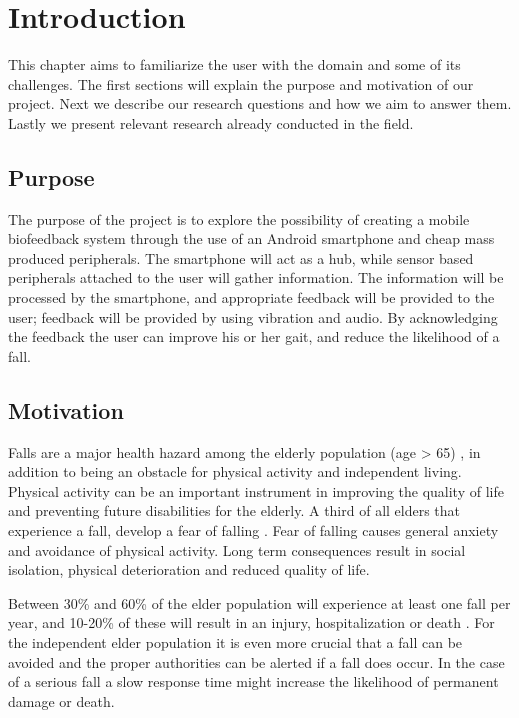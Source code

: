 \chapter{Introduction}
This chapter aims to familiarize the user with the domain and some of its challenges. The first sections will explain the purpose and motivation of our project. Next we describe our research questions and how we aim to answer them.  Lastly we present relevant research already conducted in the field.

\section{Purpose}
The purpose of the project is to explore the possibility of creating a mobile biofeedback system through the use of an Android smartphone and cheap mass produced peripherals. The smartphone will act as a hub, while sensor based peripherals attached to the user will gather information. The information will be processed by the smartphone, and appropriate feedback will be provided to the user; feedback will be provided by using vibration and audio. By acknowledging the feedback the user can improve his or her gait, and reduce the likelihood of a fall.

\section{Motivation}
Falls are a major health hazard among the elderly population (age \textgreater{} 65) \cite{fallsHealthHazard}, in addition to being an obstacle for physical activity and independent living. Physical activity can be an important instrument in improving the quality of life and preventing future disabilities for the elderly\cite{physicalActivity}. A third of all elders that experience a fall, develop a fear of falling \cite{fearOfFalling}. Fear of falling causes general anxiety and avoidance of physical activity. Long term consequences result in social isolation, physical deterioration and reduced quality of life.\cite{physicalAvoidance} %

Between 30\% and 60\% of the elder population will experience at least one fall per year, and 10-20\% of these will result in an injury, hospitalization or death \cite{fallStatistics}. For the independent elder population it is even more crucial that a fall can be avoided and the proper authorities can be alerted if a fall does occur. In the case of a serious fall a slow response time might increase the likelihood of permanent damage or death\cite{personHomeDeath, dangerousFallHome}.

